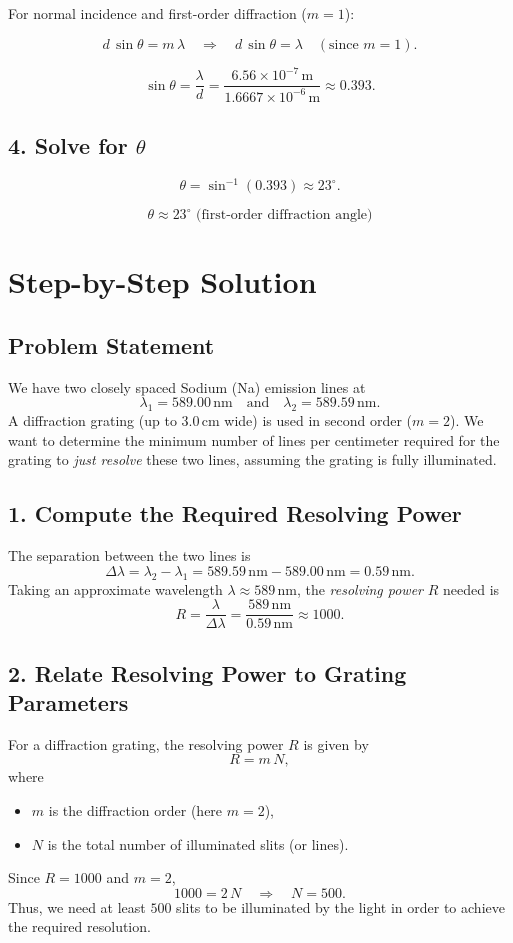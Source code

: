 \documentclass[12pt]{article}
\theoremstyle{definition} %
\theoremstyle{plain} %
\begin{document}
For normal incidence and first-order diffraction (\(m=1\)):

\[
d \,\sin \theta = m \,\lambda \quad \Longrightarrow \quad d\,\sin \theta = \lambda 
\quad (\text{since } m=1).
\]

\[
\sin \theta = \frac{\lambda}{d}
= \frac{6.56 \times 10^{-7}\,\text{m}}{1.6667 \times 10^{-6}\,\text{m}}
\approx 0.393.
\]

\subsection*{4. Solve for \(\theta\)}

\[
\theta = \sin^{-1}(0.393) \approx 23^\circ.
\]

\[
\boxed{\theta \approx 23^\circ \text{ (first-order diffraction angle)}}
\]

\section*{Step-by-Step Solution}

\subsection*{Problem Statement}
\noindent
We have two closely spaced Sodium (Na) emission lines at 
\[
\lambda_1 = 589.00\,\text{nm} 
\quad \text{and} \quad 
\lambda_2 = 589.59\,\text{nm}.
\]
A diffraction grating (up to 3.0\,cm wide) is used in second order (\(m=2\)). 
We want to determine the minimum number of lines per centimeter required 
for the grating to \emph{just resolve} these two lines, assuming 
the grating is fully illuminated.

\subsection*{1. Compute the Required Resolving Power}
The separation between the two lines is
\[
\Delta \lambda 
= \lambda_2 - \lambda_1
= 589.59\,\text{nm} - 589.00\,\text{nm} 
= 0.59\,\text{nm}.
\]
Taking an approximate wavelength \(\lambda \approx 589\,\text{nm}\), 
the \emph{resolving power} \(R\) needed is
\[
R 
= \frac{\lambda}{\Delta \lambda}
= \frac{589\,\text{nm}}{0.59\,\text{nm}}
\approx 1000.
\]

\subsection*{2. Relate Resolving Power to Grating Parameters}
For a diffraction grating, the resolving power \(R\) is given by
\[
R = m \, N,
\]
where 
\begin{itemize}
    \item \(m\) is the diffraction order (here \(m = 2\)),
    \item \(N\) is the total number of illuminated slits (or lines).
\end{itemize}
Since \(R = 1000\) and \(m = 2\),
\[
1000 = 2 \, N
\quad \Longrightarrow \quad
N = 500.
\]
Thus, we need at least \(500\) slits to be illuminated by the light 
in order to achieve the required resolution.
\end{document}
